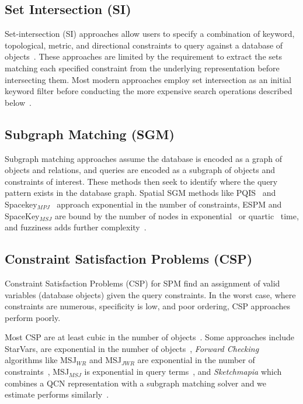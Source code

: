 \subsection{Set Intersection (SI)}
\par{  
    Set-intersection (SI) approaches allow users to specify a combination of keyword, topological, metric, and directional constraints to query against a database of objects~\cite{DiLoreto1996, Soffer1996, Soffer1997, Soffer1998a, Soffer1999}.
    These approaches are limited by the requirement to extract the sets matching each specified constraint from the underlying representation before intersecting them. 
    Most modern approaches employ set intersection as an initial keyword filter before conducting the more expensive search operations described below~\cite{Schwering2014, Osul2023}.
    

\subsection{Subgraph Matching (SGM)}
\par{
   
    Subgraph matching approaches assume the database is encoded as a graph of objects and relations, and queries are encoded as a subgraph of objects and constraints of interest.
    These methods then seek to identify where the query pattern exists in the database graph. 
    Spatial SGM methods like PQIS~\cite{Folkers2000} and Spacekey$_{MPJ}$~\cite{Fang2019} approach exponential in the number of constraints, ESPM and SpaceKey$_{MSJ}$ are bound by the number of nodes in exponential~\cite{Chen2019} or quartic~\cite{Fang2019} time, and fuzziness adds further complexity~\cite{Fang2019}.
    }
    
\subsection{Constraint Satisfaction Problems (CSP)}
    

    \par{
    Constraint Satisfaction Problems (CSP) for SPM find an assignment of valid variables (database objects) given the query constraints.
    In the worst case, where constraints are numerous, specificity is low, and poor ordering, CSP approaches perform poorly.
    
    Most CSP are at least cubic in the number of objects~\cite{Dylla2017}.
    Some approaches include StarVars, are exponential in the number of objects~\cite{Lee2013}, \textit{Forward Checking} algorithms like MSJ$_{WR}$ and MSJ$_{JWR}$  are exponential in the number of constraints~\cite{Papadias1998}, MSJ$_{MSJ}$  is exponential in query terms~\cite{Papadias1998}, and \textit{Sketchmapia} which combines a QCN representation with a subgraph matching solver and we estimate performs similarly~\cite{Schwering2014, Jan2015}.
   

}}
